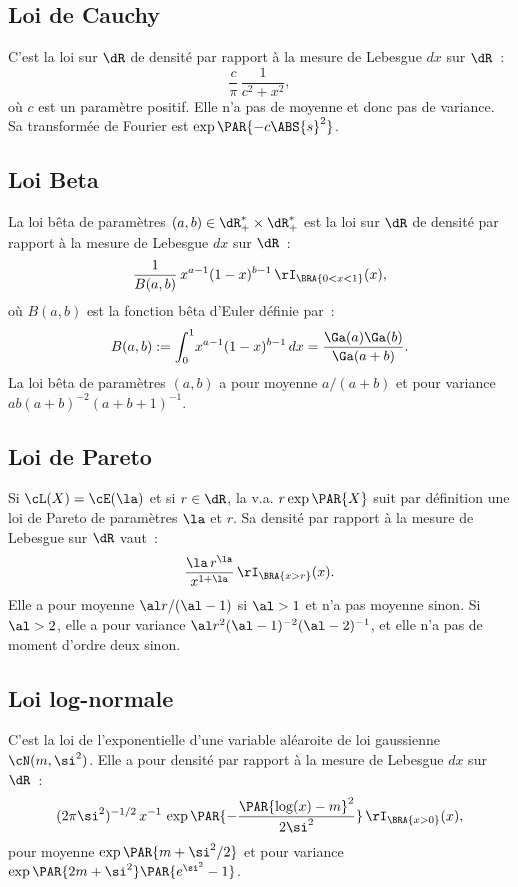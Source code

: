 %
\subsection{Loi de Cauchy}\label{ss:loi:cauchy}
%

C'est la loi sur $\dR$ de densité par rapport à la mesure de Lebesgue $dx$ sur
$\dR$~:
$$
\frac{c}{\pi}\,\frac{1}{c^2+x^2},
$$
où $c$ est un paramètre positif. Elle n'a pas de moyenne et donc pas de
variance. Sa transformée de Fourier est $\exp\PAR{-c\ABS{s}^2}$.

%
\subsection{Loi Beta}\label{ss:loi:beta}
%

La loi bêta de paramètres $(a,b)\in\dR_+^*\times\dR_+^*$ est la loi sur $\dR$ de
densité par rapport à la mesure de Lebesgue $dx$ sur $\dR$~:
$$
\frac{1}{B(a,b)}\,x^{a-1}(1-x)^{b-1}\,\rI_{\BRA{0<x<1}}(x),
$$
où $B(a,b)$ est la fonction bêta d'Euler définie par~:
$$
B(a,b):=\int_0^1\!x^{a-1}(1-x)^{b-1}\,dx=\frac{\Ga(a)\Ga(b)}{\Ga(a+b)}.
$$
La loi bêta de paramètres $(a,b)$ a pour moyenne $a/(a+b)$ et pour variance
$ab(a+b)^{-2}(a+b+1)^{-1}$.

%
\subsection{Loi de Pareto}\label{ss:loi:pareto}
%

Si $\cL(X)=\cE(\la)$ et si $r\in\dR$, la v.a. $r\exp\PAR{X}$ suit par définition
une loi de Pareto de paramètres $\la$ et $r$. Sa densité par rapport à la
mesure de Lebesgue sur $\dR$ vaut~:
$$
\frac{\la\,r^\la}{x^{1+\la}}\,\rI_{\BRA{x>r}}(x).
$$
Elle a pour moyenne $\al r /(\al-1)$ si $\al>1$ et n'a pas moyenne sinon.
Si $\al>2$, elle a pour variance $\al r^2(\al-1)^{-2}(\al-2)^{-1}$, et elle
n'a pas de moment d'ordre deux sinon.

%
\subsection{Loi log-normale}\label{ss:loi:log-normale}
%

C'est la loi de l'exponentielle d'une variable aléaroite de loi gaussienne
$\cN(m,\si^2)$. Elle a pour densité par rapport à la mesure de Lebesgue $dx$
sur $\dR$~:
$$
(2\pi\si^2)^{-1/2}\,x^{-1}\,\exp\PAR{-\frac{\PAR{\log(x)-m}^2}{2\si^2}}\,\rI_{\BRA{x>0}}(x),
$$
pour moyenne $\exp\PAR{m+\si^2/2}$ et pour variance
$\exp\PAR{2m+\si^2}\PAR{e^{\si^2}-1}$.

